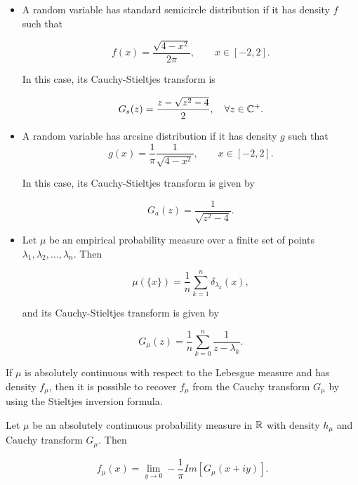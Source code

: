     \begin{example}
        \begin{itemize}
            \item A random variable has standard semicircle distribution if it has density $f$ such that
            
            \[ f(x) = \frac{\sqrt{4-x^2}}{2\pi}, \qquad x \in [-2,2]. \]

            In this case, its Cauchy-Stieltjes transform is

            \[G_s(z) = \frac{z - \sqrt{z^2-4}}{2}, \quad \forall z \in \mathbb C^+.\]
            
            \item A random variable has arcsine distribution if it has density $g$ such that
            \[ g(x) = \frac1\pi \frac{1}{\sqrt{4-x^2}}, \qquad x \in [-2,2]. \]

            In this case, its Cauchy-Stieltjes transform is given by

            \[ G_a(z) = \frac{1}{\sqrt{z^2-4}}. \]

            \item Let $\mu$ be an empirical probability measure over a finite set of points $\lambda_1,\lambda_2, \dots, \lambda_n$. Then 
            
            \[ \mu(\{x\}) = \frac1n \sum_{k=1}^n \delta_{\lambda_k}(x), \]

            \noindent and its Cauchy-Stieltjes transform is given by

            \[ G_\mu(z) = \frac1n \sum_{k=0}^n \frac{1}{z - \lambda_k}. \]
        \end{itemize}
    \end{example}

    If $\mu$ is absolutely continuous with respect to the Lebesgue measure and has density $f_\mu$, then it is possible to recover $f_\mu$ from the Cauchy transform $G_\mu$ by using the Stieltjes inversion formula.

    \begin{theorem}
        Let $\mu$ be an absolutely continuous probability measure in $\mathbb R$ with density $h_\mu$ and Cauchy transform $G_\mu$. Then

        \begin{equation*}
            f_\mu(x) = \lim_{y \to 0} - \frac1\pi Im[G_\mu(x + iy)].
        \end{equation*}
    \end{theorem}

